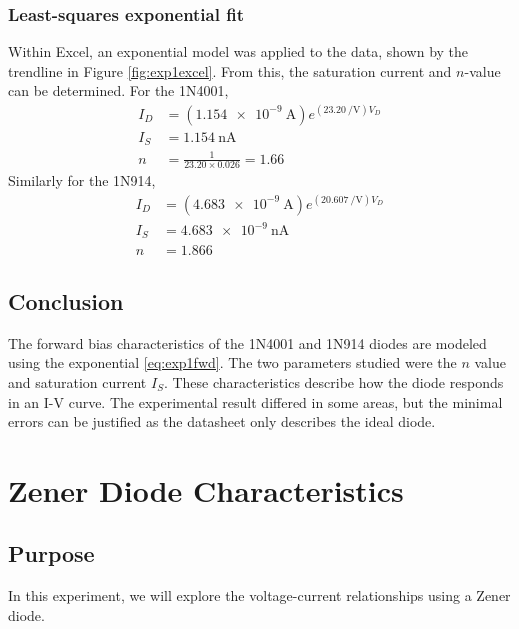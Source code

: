 \documentclass{report}
\begin{document}
\subsubsection{Least-squares exponential fit}
Within Excel, an exponential model was applied to the data, shown by the trendline in Figure \ref{fig:exp1excel}. From this, the saturation current and $n$-value can be determined. For the 1N4001, \begin{align*}
	I_D & = \left( \SI{1.154e-9}{\A}\right) e^{ \left( \SI{23.20}{\per\V}  \right) V_D} \\
		I_S & = \SI{1.154}{\nA} \\
		n & = \frac{1}{23.20 \times 0.026} = 1.66
\end{align*}
Similarly for the 1N914, \begin{align*}
	I_D & = \left( \SI{4.683e-9}{\A}\right) e^{ \left( \SI{20.607}{\per\V}  \right) V_D} \\
	I_S & = \SI{4.683e-9}{\nA} \\
	n & = 1.866
\end{align*}

\subsection{Conclusion}
The forward bias characteristics of the 1N4001 and 1N914 diodes are modeled using the exponential \eqref{eq:exp1fwd}. The two parameters studied were the $n$ value and saturation current $I_S$. These characteristics describe how the diode responds in an I-V curve. The experimental result differed in some areas, but the minimal errors can be justified as the datasheet only describes the ideal diode. 

\pagebreak
\section{Zener Diode Characteristics}

\subsection{Purpose}
In this experiment, we will explore the voltage-current relationships using a Zener diode. 
\end{document}
